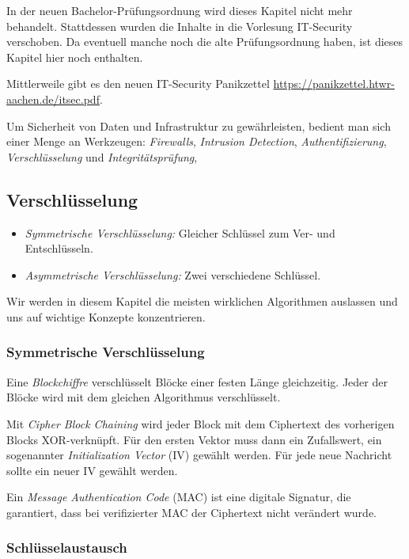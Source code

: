 \documentclass[a4paper,parskip=half*,DIV=15,fontsize=11pt]{scrartcl}
\newcommand{\PanikzettelWarnung}{\IfLanguageName{ngerman}{Warnung}{Warning}}
\newenvironment{warning}[1]{%
\setlist{nosep,leftmargin=*}%
\begin{tcolorbox}[colback=red!5!white, colframe=red!75!black, title={\sffamily \PanikzettelWarnung: #1}]
}{%
\end{tcolorbox}}
\begin{document}
\begin{warning}{Neue Bachelor-Prüfungsordnung}
    In der neuen Bachelor-Prüfungsordnung wird dieses Kapitel nicht mehr behandelt. Stattdessen wurden die Inhalte in die Vorlesung IT-Security verschoben.
    Da eventuell manche noch die alte Prüfungsordnung haben, ist dieses Kapitel hier noch enthalten.

    Mittlerweile gibt es den neuen IT-Security Panikzettel \url{https://panikzettel.htwr-aachen.de/itsec.pdf}.
\end{warning}


Um Sicherheit von Daten und Infrastruktur zu gewährleisten, bedient man sich einer Menge an Werkzeugen: \emph{Firewalls}, \emph{Intrusion Detection}, \emph{Authentifizierung}, \emph{Verschlüsselung} und \emph{Integritätsprüfung},

\subsection{Verschlüsselung}

\begin{itemize}
\item \emph{Symmetrische Verschlüsselung:} Gleicher Schlüssel zum Ver- und Entschlüsseln.
\item \emph{Asymmetrische Verschlüsselung:} Zwei verschiedene Schlüssel.
\end{itemize}

Wir werden in diesem Kapitel die meisten wirklichen Algorithmen auslassen und uns auf wichtige Konzepte konzentrieren.

\subsubsection{Symmetrische Verschlüsselung}

Eine \emph{Blockchiffre} verschlüsselt Blöcke einer festen Länge gleichzeitig. Jeder der Blöcke wird mit dem gleichen Algorithmus verschlüsselt.

Mit \emph{Cipher Block Chaining} wird jeder Block mit dem Ciphertext des vorherigen Blocks XOR-verknüpft. Für den ersten Vektor muss dann ein Zufallswert, ein sogenannter \emph{Initialization Vector} (IV) gewählt werden. Für jede neue Nachricht sollte ein neuer IV gewählt werden.

Ein \emph{Message Authentication Code} (MAC) ist eine digitale Signatur, die garantiert, dass bei verifizierter MAC der Ciphertext nicht verändert wurde.

\subsubsection{Schlüsselaustausch}
\end{document}
